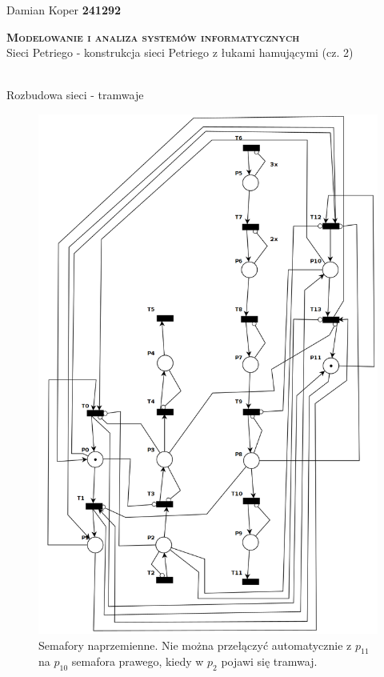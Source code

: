 \documentclass[12pt]{article}
\begin{document}
\begin{flushleft}
    Damian Koper \textbf{241292} \\
\end{flushleft}
\vspace{1cm}
{
    \centering
    {\Huge\scshape\bfseries Modelowanie i analiza systemów informatycznych }\\
    \large{Sieci Petriego - konstrukcja sieci Petriego z łukami hamującymi (cz. 2)}\\
    \vspace{0.5cm}
}
\setcounter{ex}{0}
\newcommand{\ex}[1]{
     \\
    #1
}
\clearpage
\ex{Rozbudowa sieci - tramwaje}
\vspace{-0.5cm}

\begin{figure}[H]
    \centering
    \includegraphics[width=0.7\linewidth]{../../lab8/ex_1}
    \caption{Semafory naprzemienne. Nie można przełączyć automatycznie z $p_{11}$ na $p_{10}$ semafora prawego, kiedy w $p_{2}$ pojawi się tramwaj.}
\end{figure}

\clearpage
\end{document}

